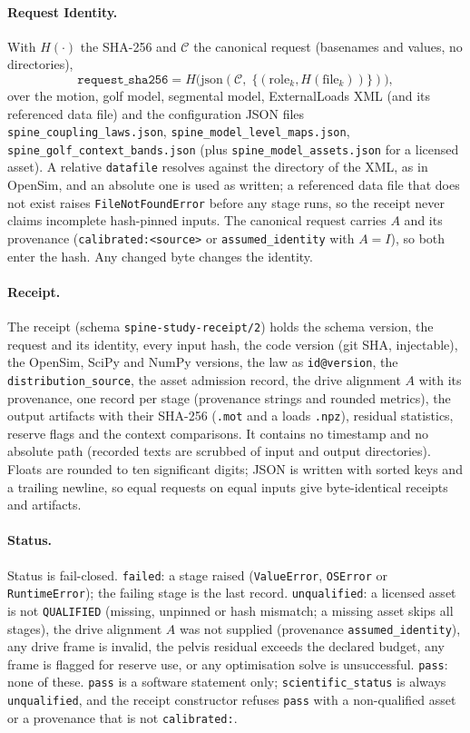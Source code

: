 \paragraph{Request Identity.}
With $H(\cdot)$ the SHA-256 and $\mathcal{C}$ the canonical request (basenames
and values, no directories),
\[
  \mathtt{request\_sha256} = H\bigl(\mathrm{json}(\mathcal{C},\;
  \{(\mathrm{role}_k, H(\mathrm{file}_k))\})\bigr),
\]
over the motion, golf model, segmental model, ExternalLoads XML (and its
referenced data file) and the configuration JSON files
\texttt{spine\_coupling\_laws.json}, \texttt{spine\_model\_level\_maps.json},
\texttt{spine\_golf\_context\_bands.json} (plus \texttt{spine\_model\_assets.json}
for a licensed asset). A relative \texttt{datafile} resolves against the
directory of the XML, as in OpenSim, and an absolute one is used as written; a
referenced data file that does not exist raises \texttt{FileNotFoundError}
before any stage runs, so the receipt never claims incomplete hash-pinned
inputs. The canonical request carries $A$ and its provenance
(\texttt{calibrated:<source>} or \texttt{assumed\_identity} with
$A=I$), so both enter the hash. Any changed byte changes the identity.

\paragraph{Receipt.}
The receipt (schema \texttt{spine-study-receipt/2}) holds the schema version, the request and its identity, every
input hash, the code version (git SHA, injectable), the OpenSim, SciPy and
NumPy versions, the law as \texttt{id@version}, the
\texttt{distribution\_source}, the asset admission record, the drive alignment $A$ with its provenance, one record per
stage (provenance strings and rounded metrics), the output artifacts with
their SHA-256 (\texttt{.mot} and a loads \texttt{.npz}), residual statistics,
reserve flags and the context comparisons. It contains no timestamp and no
absolute path (recorded texts are scrubbed of input and output directories).
Floats are rounded to ten significant digits; JSON is written with sorted keys
and a trailing newline, so equal requests on equal inputs give byte-identical
receipts and artifacts.

\paragraph{Status.}
Status is fail-closed. \texttt{failed}: a stage raised
(\texttt{ValueError}, \texttt{OSError} or \texttt{RuntimeError}); the failing
stage is the last record. \texttt{unqualified}: a licensed asset is not
\texttt{QUALIFIED} (missing, unpinned or hash mismatch; a missing asset skips
all stages), the drive alignment $A$ was not supplied (provenance
\texttt{assumed\_identity}), any drive frame is invalid, the pelvis residual exceeds the
declared budget, any frame is flagged for reserve use, or any optimisation
solve is unsuccessful. \texttt{pass}: none of these. \texttt{pass} is a
software statement only; \texttt{scientific\_status} is always
\texttt{unqualified}, and the receipt constructor refuses \texttt{pass} with a
non-qualified asset or a provenance that is not \texttt{calibrated:}.

